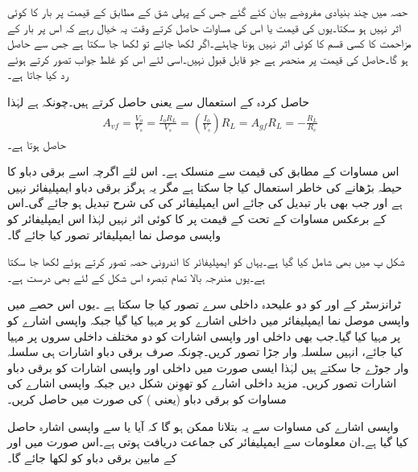 حصہ  میں چند بنیادی مفروضے بیان کئے گئے جس کے پہلی شق کے مطابق  کے قیمت پر بار  کا کوئی اثر نہیں ہو سکتا۔یوں  کی قیمت یا اس کی مساوات حاصل کرتے وقت یہ خیال رہے کہ اس پر بار کے مزاحمت  کا کسی قسم کا کوئی اثر نہیں ہونا چاہئے۔اگر  لکھا جائے تو  لکھا جا سکتا ہے جس سے  حاصل ہو گا۔حاصل  کی قیمت  پر منحصر ہے جو قابل قبول نہیں۔اسی لئے اس کو غلط جواب تصور کرتے ہوئے رد کیا جاتا ہے۔

حاصل کردہ  کے استعمال سے  یعنی  حاصل کرتے ہیں۔چونکہ  ہے لہٰذا
\begin{align}
A_{vf}=\frac{V_o}{V_s}=\frac{I_o R_L}{V_s}=\left(\frac{I_o}{V_s} \right ) R_L=A_{gf} R_L=-\frac{R_L}{R_e}
\end{align}
حاصل ہوتا ہے۔

اس مساوات کے مطابق  کی قیمت  سے منسلک ہے۔ اس لئے اگرچہ اسے برقی دباو کا حیطہ بڑھانے کی خاطر استعمال کیا جا سکتا ہے مگر یہ ہرگز برقی دباو ایمپلیفائر نہیں ہے اور جب بھی بار  تبدیل کی جائے اس ایمپلیفائر کی  کی شرح تبدیل ہو جائے گی۔اس کے برعکس مساوات  کے تحت  کے قیمت پر  کا کوئی اثر نہیں لہٰذا اس ایمپلیفائر کو واپسی موصل نما ایمپلیفائر تصور کیا جائے گا۔

شکل  پ میں  بھی شامل کیا گیا ہے۔یہاں  کو ایمپلیفائر کا اندرونی حصہ تصور کرتے ہوئے  لکھا جا سکتا ہے۔یوں مندرجہ بالا تمام تبصرہ اس شکل کے لئے بھی درست ہے۔

ٹرانزسٹر کے  اور  کو دو علیحدہ داخلی سرے تصور کیا جا سکتا ہے ۔یوں اس حصے میں واپسی موصل نما ایمپلیفائر میں داخلی اشارے  کو  پر مہیا کیا گیا جبکہ واپسی اشارے کو  پر مہیا کیا گیا۔جب بھی داخلی اور واپسی اشارات کو دو مختلف داخلی سروں پر مہیا کیا جائے، انہیں سلسلہ وار جڑا تصور کریں۔چونکہ صرف برقی دباو اشارات ہی سلسلہ وار جوڑے جا سکتے ہیں لہٰذا ایسی صورت میں داخلی اور واپسی اشارات کو برقی دباو  اشارات تصور کریں۔ مزید داخلی اشارے کو تھوِنن  شکل دیں جبکہ واپسی اشارے کی مساوات کو برقی دباو (یعنی ) کی صورت میں حاصل کریں۔

واپسی اشارے کی مساوات سے یہ بتلانا ممکن ہو گا کہ آیا  یا  سے واپسی اشارہ حاصل کیا گیا ہے۔ان معلومات سے ایمپلیفائر کی جماعت دریافت ہوتی ہے۔اس صورت میں  اور  کے مابین برقی دباو کو  لکھا جائے گا۔



